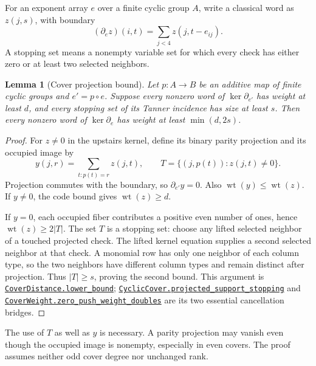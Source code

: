 \documentclass[11pt]{article}
\makeatletter
\newtheorem{lemma}[theorem]{Lemma}
\theoremstyle{definition}\newtheorem{definition}[theorem]{Definition}
\newcommand{\wt}{\operatorname{wt}}
\newcommand{\proofcommit}{98eb91cd9049e6a88887a5ba79150ad96a4a3e53}
\newcommand{\proofbase}{https://github.com/alectionary/vibe-math/blob/\proofcommit/formalization/distance-preservation}
\newcommand{\lean}[2]{\href{\proofbase/#1.lean\#L\csname leanline@#2\endcsname}{\nolinkurl{#2}}}
\makeatother
\begin{document}
For an exponent array $e$ over a finite cyclic group $A$, write a classical
word as $z(j,s)$, with boundary
\[
 (\partial_e z)(i,t)=\sum_{j<4}z(j,t-e_{ij}).
\]
A stopping set means a nonempty variable set for which every check has
either zero or at least two selected neighbors.

\begin{lemma}[Cover projection bound]\label{lem:cover}
Let $p:A\to B$ be an additive map of finite cyclic groups and
$e'=p\circ e$. Suppose every nonzero word of $\ker\partial_{e'}$
has weight at least $d$, and every stopping set of its Tanner incidence
has size at least $s$. Then every nonzero word of $\ker\partial_e$
has weight at least $\min(d,2s)$.
\end{lemma}
\begin{proof}
For $z\ne0$ in the upstairs kernel, define its binary parity projection
and its occupied image by
\[
 y(j,r)=\sum_{t:p(t)=r}z(j,t),\qquad
 T=\{(j,p(t)):z(j,t)\ne0\}.
\]
Projection commutes with the boundary, so $\partial_{e'}y=0$.
Also $\wt(y)\leq\wt(z)$. If $y\ne0$, the code bound gives
$\wt(z)\geq d$.

If $y=0$, each occupied fiber contributes a positive even number of
ones, hence $\wt(z)\geq2|T|$. The set $T$ is a stopping set:
choose any lifted selected neighbor of a touched projected check.
The lifted kernel equation supplies a second selected neighbor at
that check. A monomial row has only one neighbor of each column type,
so the two neighbors have different column types and remain distinct
after projection. Thus $|T|\geq s$, proving the second bound.
This argument is \lean{CoverDistance}{CoverDistance.lower_bound};
\lean{CyclicCover}{CyclicCover.projected_support_stopping} and
\lean{CoverWeight}{CoverWeight.zero_push_weight_doubles} are its two
essential cancellation bridges.
\end{proof}

The use of $T$ as well as $y$ is necessary. A parity projection may
vanish even though the occupied image is nonempty, especially in even
covers. The proof assumes neither odd cover degree nor unchanged rank.
\end{document}
